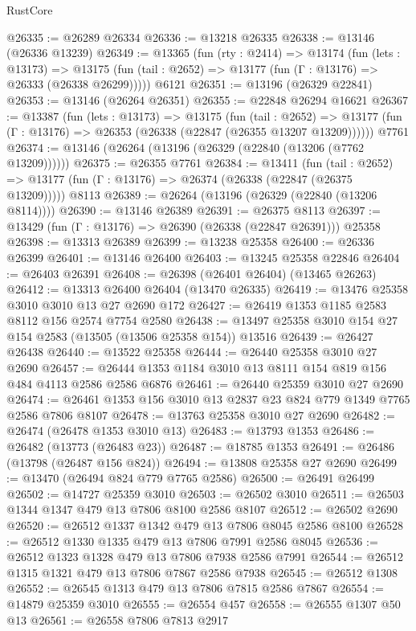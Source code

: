 \begin{lexlean}{RustCore}
\begin{coremodule}
@26335 := @26289 @26334
@26336 := @13218 @26335
@26338 := @13146 (@26336 @13239)
@26349 := @13365
    (fun (rty : @2414) =>
    @13174
      (fun (lets : @13173) =>
      @13175 (fun (tail : @2652) => @13177 (fun (Γ : @13176) => @26333 (@26338 @26299)))))
    @6121
@26351 := @13196 (@26329 @22841)
@26353 := @13146 (@26264 @26351)
@26355 := @22848 @26294 @16621
@26367 := @13387
    (fun (lets : @13173) =>
    @13175
      (fun (tail : @2652) =>
      @13177 (fun (Γ : @13176) => @26353 (@26338 (@22847 (@26355 @13207 @13209))))))
    @7761
@26374 := @13146 (@26264 (@13196 (@26329 (@22840 (@13206 (@7762 @13209))))))
@26375 := @26355 @7761
@26384 := @13411
    (fun (tail : @2652) => @13177 (fun (Γ : @13176) => @26374 (@26338 (@22847 (@26375 @13209)))))
    @8113
@26389 := @26264 (@13196 (@26329 (@22840 (@13206 @8114))))
@26390 := @13146 @26389
@26391 := @26375 @8113
@26397 := @13429 (fun (Γ : @13176) => @26390 (@26338 (@22847 @26391))) @25358
@26398 := @13313 @26389
@26399 := @13238 @25358
@26400 := @26336 @26399
@26401 := @13146 @26400
@26403 := @13245 @25358 @22846
@26404 := @26403 @26391
@26408 := @26398 (@26401 @26404) (@13465 @26263)
@26412 := @13313 @26400 @26404 (@13470 @26335)
@26419 := @13476 @25358 @3010 @3010 @13 @27 @2690 @172
@26427 := @26419 @1353 @1185 @2583 @8112 @156 @2574 @7754 @2580
@26438 := @13497 @25358 @3010 @154 @27 @154 @2583 (@13505 (@13506 @25358 @154)) @13516
@26439 := @26427 @26438
@26440 := @13522 @25358
@26444 := @26440 @25358 @3010 @27 @2690
@26457 := @26444 @1353 @1184 @3010 @13 @8111 @154 @819 @156 @484 @4113 @2586 @2586 @6876
@26461 := @26440 @25359 @3010 @27 @2690
@26474 := @26461 @1353 @156 @3010 @13 @2837 @23 @824 @779 @1349 @7765 @2586 @7806 @8107
@26478 := @13763 @25358 @3010 @27 @2690
@26482 := @26474 (@26478 @1353 @3010 @13)
@26483 := @13793 @1353
@26486 := @26482 (@13773 (@26483 @23))
@26487 := @18785 @1353
@26491 := @26486 (@13798 (@26487 @156 @824))
@26494 := @13808 @25358 @27 @2690
@26499 := @13470 (@26494 @824 @779 @7765 @2586)
@26500 := @26491 @26499
@26502 := @14727 @25359 @3010
@26503 := @26502 @3010
@26511 := @26503 @1344 @1347 @479 @13 @7806 @8100 @2586 @8107
@26512 := @26502 @2690
@26520 := @26512 @1337 @1342 @479 @13 @7806 @8045 @2586 @8100
@26528 := @26512 @1330 @1335 @479 @13 @7806 @7991 @2586 @8045
@26536 := @26512 @1323 @1328 @479 @13 @7806 @7938 @2586 @7991
@26544 := @26512 @1315 @1321 @479 @13 @7806 @7867 @2586 @7938
@26545 := @26512 @1308
@26552 := @26545 @1313 @479 @13 @7806 @7815 @2586 @7867
@26554 := @14879 @25359 @3010
@26555 := @26554 @457
@26558 := @26555 @1307 @50 @13
@26561 := @26558 @7806 @7813 @2917

\end{coremodule}
\end{lexlean}

